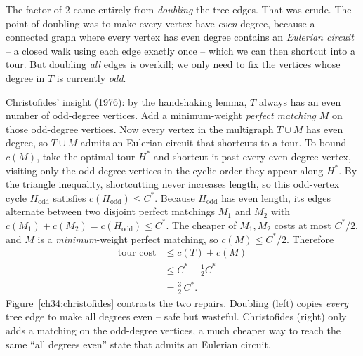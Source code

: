 The factor of $2$ came entirely from \emph{doubling} the tree edges. That was
crude. The point of doubling was to make every vertex have \emph{even} degree,
because a connected graph where every vertex has even degree contains an
\emph{Eulerian circuit} -- a closed walk using each edge exactly once -- which
we can then shortcut into a tour. But doubling \emph{all} edges is overkill;
we only need to fix the vertices whose degree in $T$ is currently \emph{odd}.

Christofides' insight (1976): by the handshaking lemma, $T$ always has an even
number of odd-degree vertices. Add a minimum-weight \emph{perfect matching} $M$
on those odd-degree vertices. Now every vertex in the multigraph $T \cup M$
has even degree, so $T \cup M$ admits an Eulerian circuit that shortcuts to a
tour. To bound $c(M)$, take the optimal tour $H^{*}$ and shortcut it past every
even-degree vertex, visiting only the odd-degree vertices in the cyclic order
they appear along $H^{*}$. By the triangle inequality, shortcutting never
increases length, so this odd-vertex cycle $H_{\mathrm{odd}}$ satisfies
$c(H_{\mathrm{odd}}) \le C^{*}$. Because $H_{\mathrm{odd}}$ has even length,
its edges alternate between two disjoint perfect matchings $M_1$ and $M_2$ with
$c(M_1) + c(M_2) = c(H_{\mathrm{odd}}) \le C^{*}$. The cheaper of $M_1, M_2$
costs at most $C^{*}/2$, and $M$ is a \emph{minimum}-weight perfect matching, so
$c(M) \le C^{*}/2$. Therefore
\begin{align*}
\text{tour cost} &\le c(T) + c(M) \\
&\le C^{*} + \tfrac{1}{2}C^{*} \\
&= \tfrac{3}{2}\,C^{*}.
\end{align*}
Figure~\ref{ch34:christofides} contrasts the two repairs. Doubling (left)
copies \emph{every} tree edge to make all degrees even -- safe but wasteful.
Christofides (right) only adds a matching on the odd-degree vertices, a much
cheaper way to reach the same ``all degrees even'' state that admits an
Eulerian circuit.

